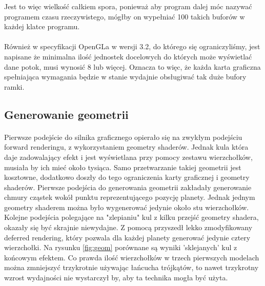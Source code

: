 Jest to więc wielkość całkiem spora, ponieważ aby program dalej móc nazywać programem czasu rzeczywistego, mógłby on wypełniać 100 takich buforów w każdej klatce programu.

\paragraph{}

Również w specyfikacji OpenGLa w wersji 3.2, do którego się ograniczyliśmy,  jest napisane że minimalna ilość jednostek docelowych do których może wyświetlać dane potok, musi wynosić 8 lub więcej. Oznacza to więc, że każda karta graficzna spełniająca wymagania będzie w stanie wydajnie obsługiwać tak duże bufory ramki.


\subsection{Generowanie geometrii}\label{sub:generowanie geometrii}
\paragraph{}

Pierwsze podejście do silnika graficznego opierało się na zwykłym podejściu forward renderingu, z wykorzystaniem geometry shaderów. Jednak kula która daje zadowalający efekt i jest wyświetlana przy pomocy zestawu wierzchołków, musiała by ich mieć około tysiąca. Samo przetwarzanie takiej geometrii jest kosztowne, dodatkowo doszły do tego ograniczenia karty graficznej i geometry shaderów. Pierwsze podejścia do generowania geometrii zakładały generowanie chmury cząstek wokół punktu reprezentującego pozycję planety. Jednak jednym geometry shaderem można było wygenerować jedynie około stu wierzchołków. Kolejne podejścia polegające na "zlepianiu" kul z kilku przejść geometry shadera, okazały się być skrajnie niewydajne. Z pomocą przyszedł lekko zmodyfikowany deferred rendering, który pozwala dla każdej planety generować jedynie cztery wierzchołki. Na rysunku \hyperref[fig:geom]{\ref*{fig:geom}} porównane są wyniki 'sklejanych' kul z końcowym efektem. Co prawda ilość wierzchołków w trzech pierwszych modelach można zmniejszyć trzykrotnie używając łańcucha trójkątów, to nawet trzykrotny wzrost wydajności nie wystarczył by, aby ta technika mogła być użyta.

